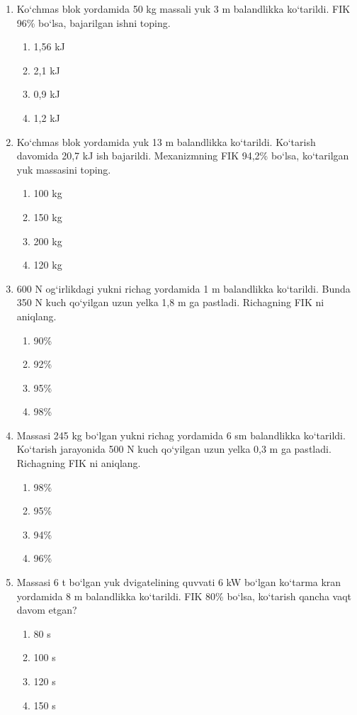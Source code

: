 \begin{enumerate}
\item Ko‘chmas blok yordamida 50 kg massali yuk 3 m balandlikka ko‘tarildi. FIK 96\% bo‘lsa, bajarilgan ishni toping.
\begin{enumerate}[label=\Alph*)]
\item 1,56 kJ
\item 2,1 kJ
\item 0,9 kJ
\item 1,2 kJ
\end{enumerate}

\item Ko‘chmas blok yordamida yuk 13 m balandlikka ko‘tarildi. Ko‘tarish davomida 20,7 kJ ish bajarildi. Mexanizmning FIK 94,2\% bo‘lsa, ko‘tarilgan yuk massasini toping.
\begin{enumerate}[label=\Alph*)]
\item 100 kg
\item 150 kg
\item 200 kg
\item 120 kg
\end{enumerate}

\item 600 N og‘irlikdagi yukni richag yordamida 1 m balandlikka ko‘tarildi. Bunda 350 N kuch qo‘yilgan uzun yelka 1,8 m ga pastladi. Richagning FIK ni aniqlang.
\begin{enumerate}[label=\Alph*)]
\item 90\%
\item 92\%
\item 95\%
\item 98\%
\end{enumerate}

\item Massasi 245 kg bo‘lgan yukni richag yordamida 6 sm balandlikka ko‘tarildi. Ko‘tarish jarayonida 500 N kuch qo‘yilgan uzun yelka 0,3 m ga pastladi. Richagning FIK ni aniqlang.
\begin{enumerate}[label=\Alph*)]
\item 98\%
\item 95\%
\item 94\%
\item 96\%
\end{enumerate}

\item Massasi 6 t bo‘lgan yuk dvigatelining quvvati 6 kW bo‘lgan ko‘tarma kran yordamida 8 m balandlikka ko‘tarildi. FIK 80\% bo‘lsa, ko‘tarish qancha vaqt davom etgan?
\begin{enumerate}[label=\Alph*)]
\item 80 s
\item 100 s
\item 120 s
\item 150 s
\end{enumerate}


\end{enumerate}
